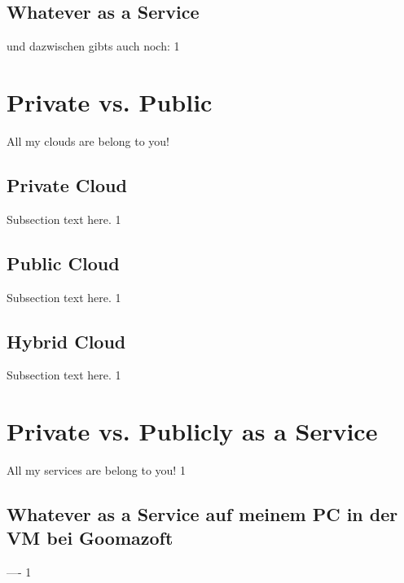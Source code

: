 \documentclass[journal]{IEEEtran}
\begin{document}
\subsection{Whatever as a Service}
und dazwischen gibts auch noch:
1


\section{Private vs. Public}
All my clouds are belong to you! 

\subsection{Private Cloud}
Subsection text here.
1

\subsection{Public Cloud}
Subsection text here.
1

\subsection{Hybrid Cloud}
Subsection text here.
1


\section{Private vs. Publicly as a Service}
All my services are belong to you!
1

\subsection{Whatever as a Service auf meinem PC in der VM bei Goomazoft}
----
1

%
%
\end{document}
